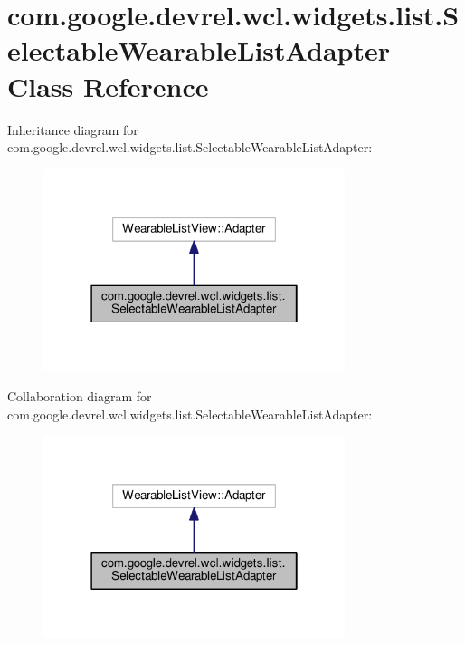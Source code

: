 \hypertarget{classcom_1_1google_1_1devrel_1_1wcl_1_1widgets_1_1list_1_1SelectableWearableListAdapter}{}\section{com.\+google.\+devrel.\+wcl.\+widgets.\+list.\+Selectable\+Wearable\+List\+Adapter Class Reference}
\label{classcom_1_1google_1_1devrel_1_1wcl_1_1widgets_1_1list_1_1SelectableWearableListAdapter}


Inheritance diagram for com.\+google.\+devrel.\+wcl.\+widgets.\+list.\+Selectable\+Wearable\+List\+Adapter\+:\nopagebreak
\begin{figure}[H]
\begin{center}
\leavevmode
\includegraphics[width=250pt]{d5/d65/classcom_1_1google_1_1devrel_1_1wcl_1_1widgets_1_1list_1_1SelectableWearableListAdapter__inherit__graph}
\end{center}
\end{figure}


Collaboration diagram for com.\+google.\+devrel.\+wcl.\+widgets.\+list.\+Selectable\+Wearable\+List\+Adapter\+:\nopagebreak
\begin{figure}[H]
\begin{center}
\leavevmode
\includegraphics[width=250pt]{d7/d02/classcom_1_1google_1_1devrel_1_1wcl_1_1widgets_1_1list_1_1SelectableWearableListAdapter__coll__graph}
\end{center}
\end{figure}
